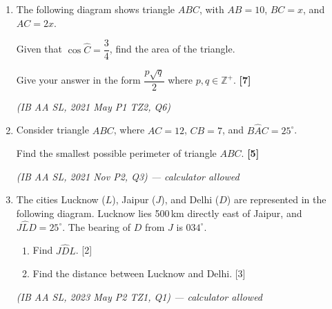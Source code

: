 \documentclass[12pt, twoside]{article}
\begin{document}
\begin{enumerate}[itemsep=0.5cm]
    \hfill \textit{(IB AA SL, 2023 May P1 TZ2, Q1)}

\newpage
\item The following diagram shows triangle $ABC$, with $AB = 10$, $BC = x$, and $AC = 2x$.

Given that $\cos\hat{C} = \dfrac{3}{4}$, find the area of the triangle.

Give your answer in the form $\dfrac{p\sqrt{q}}{2}$ where $p, q \in \mathbb{Z}^+$. \hfill \textbf{[7]}

    \hfill \textit{(IB AA SL, 2021 May P1 TZ2, Q6)}

\newpage
\item Consider triangle $ABC$, where $AC = 12$, $CB = 7$, and $B\hat{A}C = 25^\circ$.

Find the smallest possible perimeter of triangle $ABC$. \hfill \textbf{[5]}

    \hfill \textit{(IB AA SL, 2021 Nov P2, Q3) --- calculator allowed}

\newpage
\item The cities Lucknow ($L$), Jaipur ($J$), and Delhi ($D$) are represented in the following diagram. Lucknow lies 500\,km directly east of Jaipur, and $J\hat{L}D = 25^\circ$. The bearing of $D$ from $J$ is $034^\circ$.

    \begin{enumerate}[itemsep=0.15cm]
        \item Find $J\hat{D}L$. \hfill [2]
        \item Find the distance between Lucknow and Delhi. \hfill [3]
    \end{enumerate}

    \hfill \textit{(IB AA SL, 2023 May P2 TZ1, Q1) --- calculator allowed}


\end{enumerate}
\end{document}

